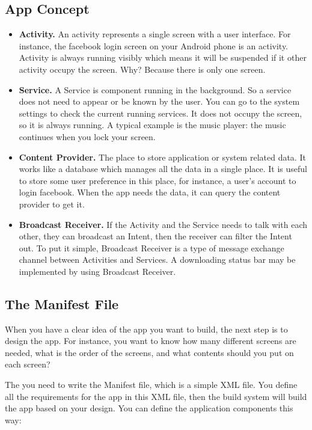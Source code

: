 \documentclass[10pt, letterpaper]{article}
\begin{document}
\subsection{App Concept}
\begin{itemize}
\item \textbf{Activity.} An activity represents a single screen with a user interface. For instance, the facebook login screen on your Android phone is an activity. Activity is always running visibly which means it will be suspended if it other activity occupy the screen. Why? Because there is only one screen.

\item \textbf{Service.} A Service is component running in the background. So a service does not need to appear or be known by the user. You can go to the system settings to check the current running services. It does not occupy the screen, so it is always running. A typical example is the music player: the music continues when you lock your screen.

\item \textbf{Content Provider.} The place to store application or system related data. It works like a database which manages all the data in a single place. It is useful to store some user preference in this place, for instance, a user's account to login facebook. When the app needs the data, it can query the content provider to get it.

\item \textbf{Broadcast Receiver.} If the Activity and the Service needs to talk with each other, they can broadcast an Intent, then the receiver can filter the Intent out. To put it simple, Broadcast Receiver is a type of message exchange channel between Activities and Services. A downloading status bar may be implemented by using Broadcast Receiver.
\end{itemize}

\subsection{The Manifest File}
When you have a clear idea of the app you want to build, the next step is to design the app. For instance, you want to know how many different screens are needed, what is the order of the screens, and what contents should you put on each screen?

The you need to write the Manifest file, which is a simple XML file. You define all the requirements for the app in this XML file, then the build system will build the app based on your design. You can define the application components this way:
\end{document}
